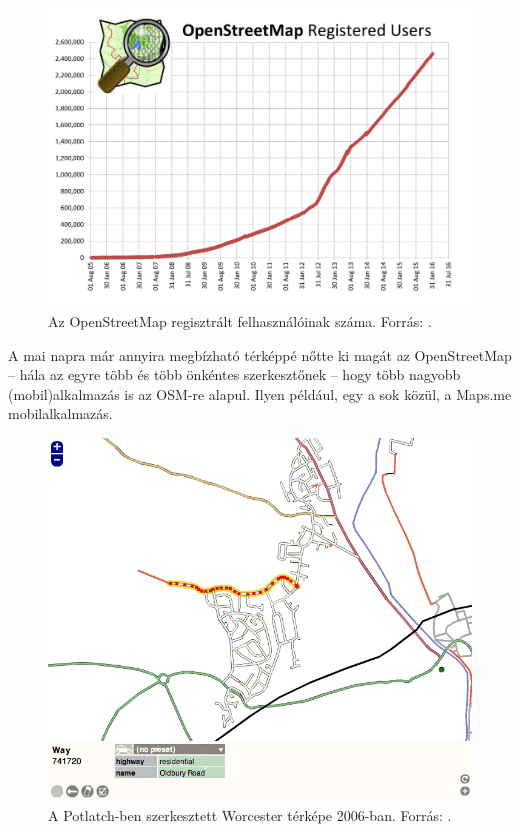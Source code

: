 \documentclass[a4paper,12pt]{report}
\begin{document}
\begin{figure}[ht]
\centerline{
\includegraphics[width=5.5in]{img/osmusers}}
\caption{Az OpenStreetMap regisztrált felhasználóinak száma. Forrás: \cite{osmhistory}.}
\label{osmusers}
\end{figure}

A mai napra már annyira megbízható térképpé nőtte ki magát az OpenStreetMap -- hála az egyre több és több önkéntes szerkesztőnek -- hogy több nagyobb (mobil)alkalmazás is az OSM-re alapul. Ilyen például, egy a sok közül, a Maps.me \cite{mapsme} mobilalkalmazás.

\begin{figure}[ht]
\centering
\includegraphics[width=5in]{img/oldworcester}
\caption{A Potlatch-ben szerkesztett Worcester térképe 2006-ban. Forrás: \cite{osmhistory}.}
\label{oldworcester}
\end{figure}
\end{document}
